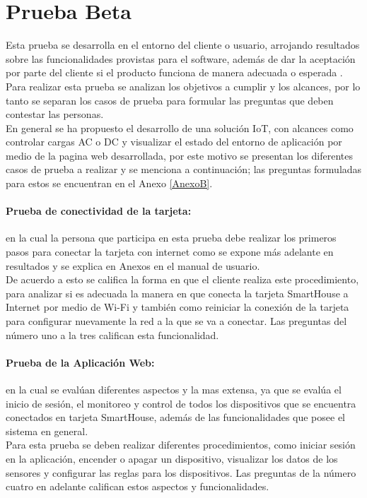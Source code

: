 \section{Prueba Beta}

Esta prueba se desarrolla en el entorno del cliente o usuario, arrojando resultados sobre las funcionalidades provistas para el software, además de dar la aceptación por parte del cliente si el producto funciona de manera adecuada o esperada \cite{PB}. Para realizar esta prueba se analizan los objetivos a cumplir y los alcances, por lo tanto se separan los casos de prueba para formular las preguntas que deben contestar las personas.\\

En general se ha propuesto el desarrollo de una solución IoT, con alcances como controlar cargas AC o DC y visualizar el estado del entorno de aplicación por medio de la pagina web desarrollada, por este motivo se presentan los diferentes casos de prueba a realizar y se menciona a continuación; las preguntas formuladas para estos se encuentran en el Anexo \ref{AnexoB}.

\paragraph{Prueba de conectividad de la tarjeta:} en la cual la persona que participa en esta prueba debe realizar los primeros pasos para conectar la tarjeta con internet como se expone más adelante en resultados y se explica en Anexos en el manual de usuario.\\

De acuerdo a esto se califica la forma en que el cliente realiza este procedimiento, para analizar si es adecuada la manera en que conecta la tarjeta SmartHouse a Internet por medio de Wi-Fi y también como reiniciar la conexión de la tarjeta para configurar nuevamente la red a la que se va a conectar. Las preguntas del número uno a la tres califican esta funcionalidad.

\paragraph{Prueba de la Aplicación Web:} en la cual se evalúan diferentes aspectos y la mas extensa, ya que se evalúa el inicio de sesión, el monitoreo y control de todos los dispositivos que se encuentra conectados en tarjeta SmartHouse, además de las funcionalidades que posee el sistema en general.\\

Para esta prueba se deben realizar diferentes procedimientos, como iniciar sesión en la aplicación, encender o apagar un dispositivo, visualizar los datos de los sensores y configurar las reglas para los dispositivos. Las preguntas de la número cuatro en adelante califican estos aspectos y funcionalidades.